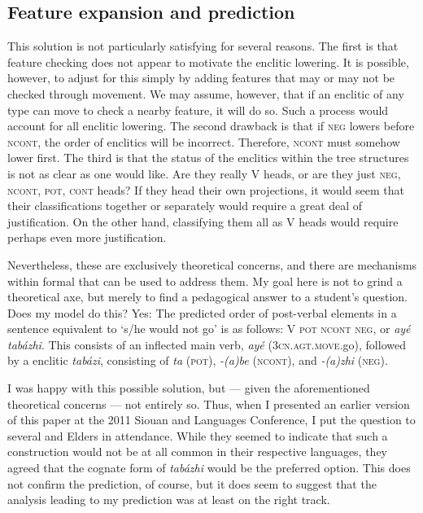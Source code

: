 \documentclass[output=paper]{LSP/langsci}
\begin{document}
\subsection{Feature expansion and prediction}
This solution is not particularly satisfying for several reasons. The first is that feature checking does not appear to motivate the enclitic lowering. It is possible, however, to adjust for this simply by adding features that may or may not be checked through movement. We may assume, however, that if an enclitic of any type can move to check a nearby feature, it will do so. Such a process would account for all enclitic lowering. The second drawback is that if \textsc{neg} lowers before \textsc{ncont}, the order of enclitics will be incorrect. Therefore, \textsc{ncont} must somehow lower first. The third is that the status of the enclitics within the tree structures is not as clear as one would like. Are they really V heads, or are they just \textsc{neg, ncont, pot, cont} heads? If they head their own projections, it would seem that their classifications together or separately would require a great deal of justification. On the other hand, classifying them all as V heads would require perhaps even more justification.

Nevertheless, these are exclusively theoretical concerns, and there are mechanisms within formal  that can be used to address them. My goal here is not to grind a theoretical axe, but merely to find a pedagogical answer to a student's question. Does my model do this? Yes: The predicted order of post-verbal elements in a  sentence equivalent to  `s/he would not go' is as follows: V \textsc{pot ncont} \textsc{neg}, or \textit{ay\'e tabázhi}. This consists of an inflected main verb, \textit{ay\'e} (\textsc{3cn.agt.move}.go), followed by a  enclitic \textit{tabázi}, consisting of \textit{ta} (\textsc{pot}), \textit{-(a)be} (\textsc{ncont}), and \textit{-(a)zhi} (\textsc{neg}).
	
I was happy with this possible solution, but --- given the aforementioned theoretical concerns --- not entirely so. Thus, when I presented an earlier version of this paper at the 2011 Siouan and  Languages Conference, I put the question to several  and  Elders in attendance. While they seemed to indicate that such a construction would not be at all common in their respective languages, they agreed that the cognate form of  \textit{tabázhi} would be the preferred option. This does not confirm the  prediction, of course, but it does seem to suggest that the analysis leading to my prediction was at least on the right track.
\end{document}
